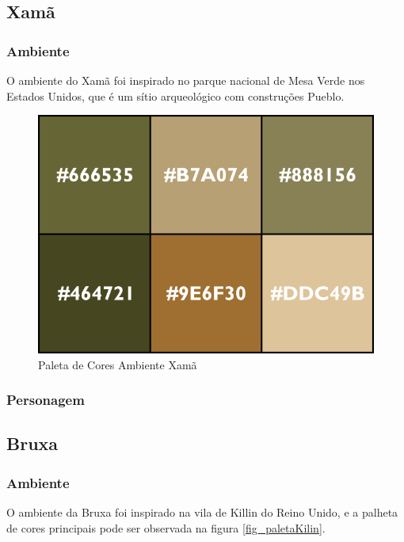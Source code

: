 \clearpage

\subsection{Xamã}

\subsubsection{Ambiente}
O ambiente do Xamã foi inspirado no parque nacional de Mesa Verde nos Estados Unidos, que é um sítio arqueológico com construções Pueblo.

\begin{figure}[htb]
	\caption{\label{fig_paletaMesa}Paleta de Cores Ambiente Xamã}
	\begin{center}
	    \includegraphics[width=\textwidth/2]{imagens/PaletaMesaVerde.png}
	\end{center}
\end{figure}




\subsubsection{Personagem}

\subsection{Bruxa}
\subsubsection{Ambiente}
O ambiente da Bruxa foi inspirado na vila de Killin do Reino Unido, e a palheta de cores principais pode ser observada na figura \ref{fig_paletaKilin}.

